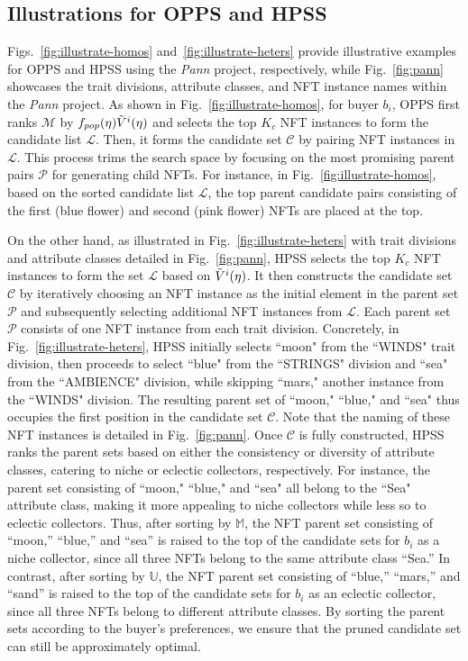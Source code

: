 \documentclass[conference]{IEEEtran}
\newcommand{\1}[1]{\mathds{1}\left[#1\right]}
\theoremstyle{plain}
\newcommand{\homos}{OPPS\xspace}
\newcommand{\heters}{HPSS\xspace}
\begin{document}
{\subsection{Illustrations for \homos and \heters}
\label{appsubsec:breeding-utility}

    Figs.~\ref{fig:illustrate-homos} and~\ref{fig:illustrate-heters} provide illustrative examples for \homos and \heters using the \emph{Pann} project, respectively, while Fig.~\ref{fig:pann} showcases the trait divisions, attribute classes, and NFT instance names within the \emph{Pann} project. As shown in Fig.~\ref{fig:illustrate-homos}, for buyer $b_i$, \homos first ranks $\mathcal{M}$ by $f_{pop}(\eta)\Tilde{V}^i(\eta)$ and selects the top $K_c$ NFT instances to form the candidate list $\mathcal{L}$. Then, it forms the candidate set $\mathcal{C}$ by pairing NFT instances in $\mathcal{L}$. This process trims the search space by focusing on the most promising parent pairs $\mathcal{P}$ for generating child NFTs. For instance, in Fig.~\ref{fig:illustrate-homos}, based on the sorted candidate list $\mathcal{L}$, the top parent candidate pairs consisting of the first (blue flower) and second (pink flower) NFTs are placed at the top.

    On the other hand, as illustrated in Fig.~\ref{fig:illustrate-heters} with trait divisions and attribute classes detailed in Fig.~\ref{fig:pann}, \heters selects the top $K_c $ NFT instances to form the set $\mathcal{L}$ based on $\Tilde{V}^i(\eta)$. It then constructs the candidate set $\mathcal{C}$ by iteratively choosing an NFT instance as the initial element in the parent set $\mathcal{P}$ and subsequently selecting additional NFT instances from $\mathcal{L}$. Each parent set $\mathcal{P}$ consists of one NFT instance from each trait division. Concretely, in Fig.~\ref{fig:illustrate-heters}, \heters initially selects ``moon" from the ``WINDS" trait division, then proceeds to select ``blue" from the ``STRINGS" division and ``sea" from the ``AMBIENCE" division, while skipping ``mars," another instance from the ``WINDS" division. The resulting parent set of ``moon," ``blue," and ``sea" thus occupies the first position in the candidate set $\mathcal{C}$. Note that the naming of these NFT instances is detailed in Fig.~\ref{fig:pann}. Once $\mathcal{C}$ is fully constructed, \heters ranks the parent sets based on either the consistency or diversity of attribute classes, catering to niche or eclectic collectors, respectively. For instance, the parent set consisting of ``moon," ``blue," and ``sea" all belong to the ``Sea" attribute class, making it more appealing to niche collectors while less so to eclectic collectors. Thus, after sorting by $\mathbb{M}$, the NFT parent set consisting of ``moon,'' ``blue,'' and ``sea'' is raised to the top of the candidate sets for $b_i$ as a niche collector, since all three NFTs belong to the same attribute class ``Sea.'' In contrast, after sorting by $\mathbb{U}$, the NFT parent set consisting of ``blue,'' ``mars,'' and ``sand'' is raised to the top of the candidate sets for $b_i$ as an eclectic collector, since all three NFTs belong to different attribute classes. By sorting the parent sets according to the buyer's preferences, we ensure that the pruned candidate set can still be approximately optimal.

}
\end{document}

